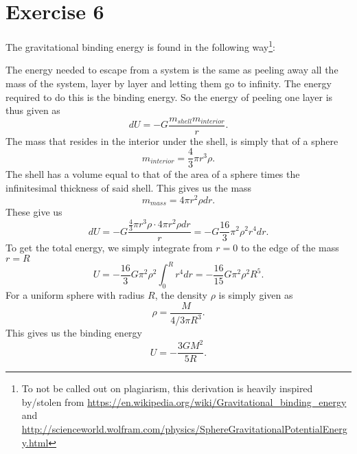\documentclass[a4paper,norsk, 10pt]{article}
\begin{document}
\section{Exercise 6}
The gravitational binding energy is found in the following way\footnote{To not be called out on plagiarism, this derivation is heavily inspired by/stolen from \url{https://en.wikipedia.org/wiki/Gravitational_binding_energy} and \url{http://scienceworld.wolfram.com/physics/SphereGravitationalPotentialEnergy.html}}:

The energy needed to escape from a system is the same as peeling away all the mass of the system, layer by layer and letting them go to infinity. The energy required to do this is the binding energy. So the energy of peeling one layer is thus given as
\begin{equation}
dU = - G\frac{m_{shell}m_{interior}}{r}.
\end{equation}
The mass that resides in the interior under the shell, is simply that of a sphere
\begin{equation}
m_{interior} = \frac{4}{3}\pi r^3 \rho.
\end{equation}
The shell has a volume equal to that of the area of a sphere times the infinitesimal thickness of said shell. This gives us the mass
\begin{equation}
m_{mass} = 4\pi r^2\rho dr.
\end{equation}
These give us
\begin{equation}
dU = - G\frac{\frac{4}{3}\pi r^3 \rho\cdot 4\pi r^2\rho dr}{r} = -G\frac{16}{3}\pi^2\rho^2 r^4 dr.
\end{equation}
To get the total energy, we simply integrate from $r=0$ to the edge of the mass $r=R$
\begin{equation}
U = -\frac{16}{3}G\pi^2\rho^2 \int_0^R r^4 dr = -\frac{16}{15}G\pi^2\rho^2 R^5.
\end{equation}
For a uniform sphere with radius $R$, the density $\rho$ is simply given as
\begin{equation}
\rho = \frac{M}{4/3 \pi R^3}.
\end{equation}
This gives us the binding energy
\begin{equation}
U = -\frac{3GM^2}{5R}.
\end{equation}
\end{document}
